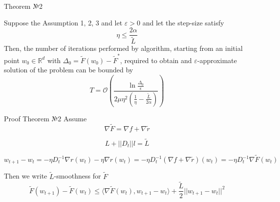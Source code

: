 \documentclass[aspectratio=169, 12pt]{beamer}
\begin{document}
\begin{frame}{Theorem №2}
    \begin{theorem}
    Suppose the Assumption 1, 2, 3 and let $\varepsilon > 0$ and let the step-size satisfy
    \begin{equation*}
        \eta \leq \frac{2 \alpha}{\tilde{L}}
    \end{equation*}
    Then, the number of iterations performed by algorithm, starting from an initial point $w_0 \in \mathbb{R}^d$ with $\Delta_0 = \tilde{F}(w_0) - \tilde{F}^*$, required to obtain and $\varepsilon$-approximate solution of the problem can be bounded by
    \begin{equation*}
        T =  \mathcal{O}\left( \frac{\ln \frac{\Delta_0}{\epsilon}}{2 \mu \eta^2(\frac{1}{\eta} - \frac{\tilde{L}}{2 \alpha})} \right)
    \end{equation*}
\end{theorem}
\end{frame}

\begin{frame}{Proof Theorem №2}
        Assume 
    \begin{equation*}
    \nabla \tilde{F} = \nabla f + \nabla \tilde{r}    
    \end{equation*}
    
    \begin{equation*}
    L + ||D_t||l = \tilde{L}        
    \end{equation*}
    
    \begin{equation*}
    w_{t+1} - w_t = -\eta D_t^{-1} \nabla r(w_t) - \eta \nabla r(w_t) = -\eta D_t^{-1} (\nabla f + \nabla \tilde{r})(w_t) = -\eta D_t^{-1} \nabla \tilde{F}(w_t)    
    \end{equation*}
    
    Then we write $\tilde{L}$-smoothness for $\tilde{F}$ 
    \begin{equation*}
        \tilde{F}(w_{t+1}) - \tilde{F}(w_t) \leq  \langle \nabla \tilde{F}(w_t), w_{t+1} - w_t \rangle + \frac{\tilde{L}}{2} ||w_{t+1} - w_t||^2
    \end{equation*}

    
\end{frame}
\end{document}
